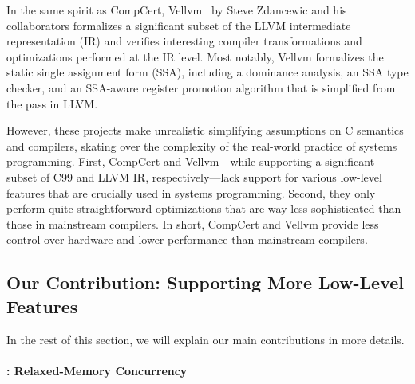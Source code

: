 In the same spirit as CompCert, Vellvm~\cite{vellvm} by Steve Zdancewic and his collaborators
formalizes a significant subset of the LLVM intermediate representation (IR) and verifies
interesting compiler transformations and optimizations performed at the IR level.  Most notably,
Vellvm formalizes the static single assignment form (SSA), including a dominance analysis, an SSA
type checker, and an SSA-aware register promotion algorithm that is simplified from the
 pass in LLVM.


However, these projects make unrealistic simplifying assumptions on C semantics and compilers,
skating over the complexity of the real-world practice of systems programming.  First, CompCert and
Vellvm---while supporting a significant subset of C99 and LLVM IR, respectively---lack support for
various low-level features that are crucially used in systems programming.  Second, they only
perform quite straightforward optimizations that are way less sophisticated than those in mainstream
compilers.  In short, CompCert and Vellvm provide less control over hardware and lower performance
than mainstream compilers.



\subsection{Our Contribution: Supporting More Low-Level Features}


In the rest of this section, we will explain our main contributions in more details.



\paragraph{: Relaxed-Memory Concurrency}

